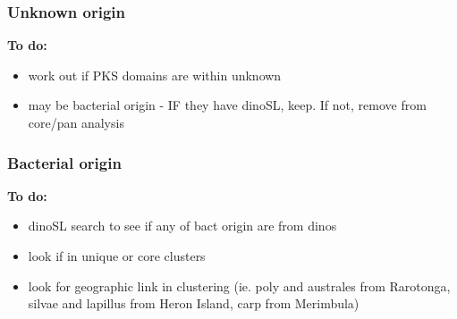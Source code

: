 \documentclass[12pt]{article}
\begin{document}
\subsubsection*{Unknown origin}
\textbf{To do:}
\begin{itemize}
\item work out if PKS domains are within unknown
\item may be bacterial origin - IF they have dinoSL, keep. If not, remove from core/pan analysis 
\end{itemize}
\subsubsection*{Bacterial origin}
\textbf{To do:}
\begin{itemize}
\item dinoSL search to see if any of bact origin are from dinos
\item look if in unique or core clusters
\item look for geographic link in clustering (ie. poly and australes from Rarotonga, silvae and lapillus from Heron Island, carp from Merimbula)
\end{itemize}
\end{document}
